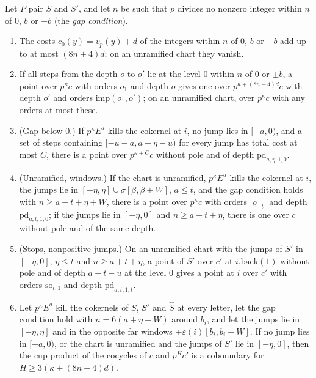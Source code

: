 \begin{lemma}\label{lem:deep-points}
Let $P$ pair $S$ and $S'$, and let $n$ be such that $p$ divides no nonzero integer within $n$ of $0$, $b$ or $-b$ (the \emph{gap condition}).
\begin{enumerate}[label=\textup{(\alph*)}]
\item The costs $c_0(y)=v_p(y)+d$ of the integers within $n$ of $0$, $b$ or $-b$ add up to at most $(8n+4)d$; on an unramified chart they vanish.
\item If all steps from the depth $o$ to $o'$ lie at the level $0$ within $n$ of $0$ or $\pm b$, a point over $p^\kappa c$ with orders $o_1$ and depth $o$ gives one over $p^{\kappa+(8n+4)d}c$ with depth $o'$ and orders $\mathrm{imp}(o_1,o')$; on an unramified chart, over $p^\kappa c$ with any orders at most these.
\item (Gap below $0$.) If $p^\kappa E^a$ kills the cokernel at $i$, no jump lies in $[-a,0)$, and a set of steps containing $[-u-a,a+\eta-u)$ for every jump has total cost at most $C$, there is a point over $p^{\kappa+C}c$ without pole and of depth $\mathrm{pd}_{a,\eta,1,0}$.
\item (Unramified, windows.) If the chart is unramified, $p^\kappa E^a$ kills the cokernel at $i$, the jumps lie in $[-\eta,\eta]\cup\sigma[\beta,\beta+W]$, $a\le t$, and the gap condition holds with $n\ge a+t+\eta+W$, there is a point over $p^\kappa c$ with orders $\varrho_{-t}$ and depth $\mathrm{pd}_{a,t,1,0}$; if the jumps lie in $[-\eta,0]$
and $n\ge a+t+\eta$, there is one over $c$ without pole and of the same depth.
\item (Stops, nonpositive jumps.) On an unramified chart with the jumps of $S'$ in $[-\eta,0]$, $\eta\le t$ and $n\ge a+t+\eta$, a point of $S'$ over $c'$ at $i.\mathrm{back}(1)$ without pole and of depth $a+t-u$ at the level $0$ gives a point at $i$ over $c'$ with orders $\mathrm{so}_{t,1}$ and depth $\mathrm{pd}_{a,t,1,t}$.
\item Let $p^\kappa E^a$ kill the cokernels of $S$, $S'$ and $\hat S$ at every letter, let the gap condition hold with $n=6(a+\eta+W)$ around $b_i$, and let the jumps lie in $[-\eta,\eta]$ and in the opposite far windows $\mp\varepsilon(i)[b_i,b_i+W]$. If no jump lies in $[-a,0)$, or the chart is unramified and the jumps of $S'$ lie in
$[-\eta,0]$, then the cup product of the cocycles of $c$ and $p^Hc'$ is a coboundary for $H\ge3(\kappa+(8n+4)d)$.
\end{enumerate}
\end{lemma}

